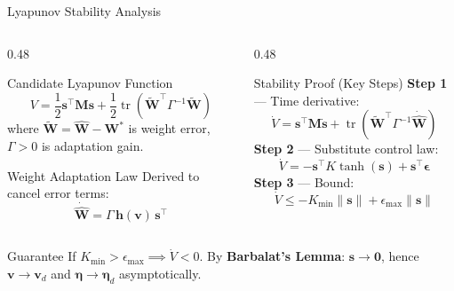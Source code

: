 \documentclass[aspectratio=169,10pt]{beamer}
\begin{document}
\begin{frame}{Lyapunov Stability Analysis}
\small %

\begin{columns}[T, onlytextwidth]
  \begin{column}{0.48\textwidth}
    \begin{block}{Candidate Lyapunov Function}
      \[
        V = \frac{1}{2}\mathbf{s}^\top\mathbf{M}\mathbf{s} 
        + \frac{1}{2}\operatorname{tr}\!\left(\tilde{\mathbf{W}}^\top \Gamma^{-1}\tilde{\mathbf{W}}\right)
      \]
      \scriptsize where $\tilde{\mathbf{W}} = \hat{\mathbf{W}} - \mathbf{W}^*$ is weight error, $\Gamma > 0$ is adaptation gain.
    \end{block}

    \begin{block}{Weight Adaptation Law}
      Derived to cancel error terms:
      \[
        \dot{\hat{\mathbf{W}}} = \Gamma\,\mathbf{h}(\mathbf{v})\,\mathbf{s}^\top
      \]
    \end{block}
  \end{column}

  \hfill

  \begin{column}{0.48\textwidth}
    \begin{block}{Stability Proof (Key Steps)}
      \textbf{Step 1} — Time derivative:
      \[
        \dot{V} = \mathbf{s}^\top\mathbf{M}\dot{\mathbf{s}} 
        + \operatorname{tr}\!\left(\tilde{\mathbf{W}}^\top\Gamma^{-1}\dot{\hat{\mathbf{W}}}\right)
      \]
      \textbf{Step 2} — Substitute control law:
      \[
        \dot{V} = -\mathbf{s}^\top K\tanh(\mathbf{s}) + \mathbf{s}^\top\bm{\epsilon}
      \]
      \textbf{Step 3} — Bound:
      \[
        \dot{V} \leq -K_{\min}\|\mathbf{s}\| + \epsilon_{\max}\|\mathbf{s}\|
      \]
    \end{block}
  \end{column}
\end{columns}

\vspace{4pt}

\begin{exampleblock}{Guarantee}
  If $K_{\min} > \epsilon_{\max} \implies \dot{V} < 0$. 
  By \textbf{Barbalat's Lemma}: $\mathbf{s}\to\mathbf{0}$, hence $\mathbf{v}\to\mathbf{v}_d$ and $\bm{\eta}\to\bm{\eta}_d$ asymptotically.
\end{exampleblock}

\end{frame}
\end{document}
